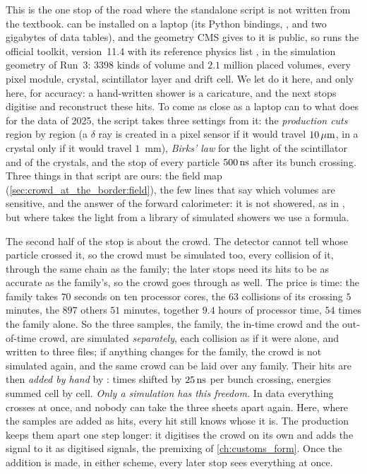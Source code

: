This is the one stop of the road where the standalone script is not
written from the textbook. \GEANT can be installed on a laptop (its Python
bindings, , and two gigabytes of data tables), and the
geometry CMS gives to it is public, so  runs the official
toolkit, version~11.4 with its reference physics list , in
the simulation geometry of Run~3: $3398$ kinds of volume and $2.1$ million
placed volumes, every pixel module, crystal, scintillator layer and drift
cell. We let \GEANT do it here, and only here, for accuracy: a hand-written
shower is a caricature, and the next stops digitise and reconstruct these
hits. To come as close as a laptop can to what \CMSSW does for the data of
2025, the script takes three settings from it: the \emph{production cuts}
region by region (a $\delta$ ray is created in a pixel sensor if it would
travel $10\,\mu\mathrm{m}$, in a crystal only if it would travel $1$~mm), \emph{Birks'
law} for the light of the scintillator and of the crystals, and the stop of
every particle $500\,\mathrm{ns}$ after its bunch crossing. Three things in that
script are ours: the field map (\cref{sec:crowd_at_the_border:field}), the
few lines that say which volumes are sensitive, and the answer of the forward
calorimeter: it is not showered, as in \CMSSW, but where \CMSSW takes the
light from a library of simulated showers we use a formula.

The second half of the stop is about the crowd. The detector cannot tell
whose particle crossed it, so the crowd must be simulated too, every
collision of it, through the same chain as the family; the later stops
need its hits to be as accurate as the family's, so the crowd goes through
\GEANT as well. The price is time: the family takes
$70$ seconds on ten processor cores, the $63$ collisions of
its crossing $5$ minutes, the $897$ others
$51$ minutes, together
$9.4$ hours of
processor time, $54$ times
the family alone. So the three samples, the family, the in-time crowd and
the out-of-time crowd, are simulated \emph{separately}, each collision as
if it were alone, and written to three files; if anything changes for the
family, the crowd is not simulated again, and the same crowd can be laid
over any family. Their hits are then \emph{added by hand} by
: times shifted by $25\,\mathrm{ns}$ per bunch crossing,
energies summed cell by cell. \emph{Only a simulation has this freedom.} In
data everything crosses at once, and nobody can take the three sheets apart
again. Here, where the samples are added as hits, every hit still knows
whose it is. The production keeps them apart one step longer: it digitises
the crowd on its own and adds the signal to it as digitised signals, the
premixing of \cref{ch:customs_form}. Once the addition is made, in either
scheme, every later stop sees everything at once.

